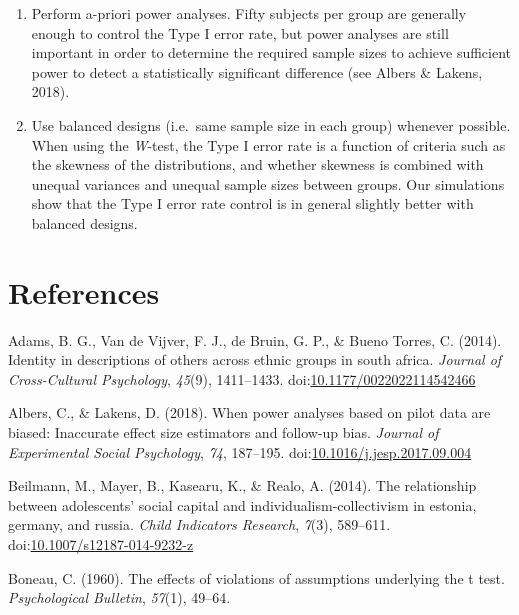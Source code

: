 \documentclass[man,floatsintext]{apa6}
\begin{document}
\begin{enumerate}
\item
  Perform a-priori power analyses. Fifty subjects per group are generally enough to control the Type I error rate, but power analyses are still important in order to determine the required sample sizes to achieve sufficient power to detect a statistically significant difference (see Albers \& Lakens, 2018).
\item
  Use balanced designs (i.e.~same sample size in each group) whenever possible. When using the \emph{W}-test, the Type I error rate is a function of criteria such as the skewness of the distributions, and whether skewness is combined with unequal variances and unequal sample sizes between groups. Our simulations show that the Type I error rate control is in general slightly better with balanced designs.
\end{enumerate}

\newpage

\hypertarget{references}{%
\section{References}\label{references}}

\setlength{\parindent}{-0.5in}
\setlength{\leftskip}{0.5in}

\hypertarget{refs}{}
\leavevmode\hypertarget{ref-Adams_et_al_2014}{}%
Adams, B. G., Van de Vijver, F. J., de Bruin, G. P., \& Bueno Torres, C. (2014). Identity in descriptions of others across ethnic groups in south africa. \emph{Journal of Cross-Cultural Psychology}, \emph{45}(9), 1411--1433. doi:\href{https://doi.org/10.1177/0022022114542466}{10.1177/0022022114542466}

\leavevmode\hypertarget{ref-Albers_and_Lakens_2018}{}%
Albers, C., \& Lakens, D. (2018). When power analyses based on pilot data are biased: Inaccurate effect size estimators and follow-up bias. \emph{Journal of Experimental Social Psychology}, \emph{74}, 187--195. doi:\href{https://doi.org/10.1016/j.jesp.2017.09.004}{10.1016/j.jesp.2017.09.004}

\leavevmode\hypertarget{ref-Beilmann_et_al_2014}{}%
Beilmann, M., Mayer, B., Kasearu, K., \& Realo, A. (2014). The relationship between adolescents' social capital and individualism-collectivism in estonia, germany, and russia. \emph{Child Indicators Research}, \emph{7}(3), 589--611. doi:\href{https://doi.org/10.1007/s12187-014-9232-z}{10.1007/s12187-014-9232-z}

\leavevmode\hypertarget{ref-Boneau_1960}{}%
Boneau, C. (1960). The effects of violations of assumptions underlying the t test. \emph{Psychological Bulletin}, \emph{57}(1), 49--64.
\end{document}

